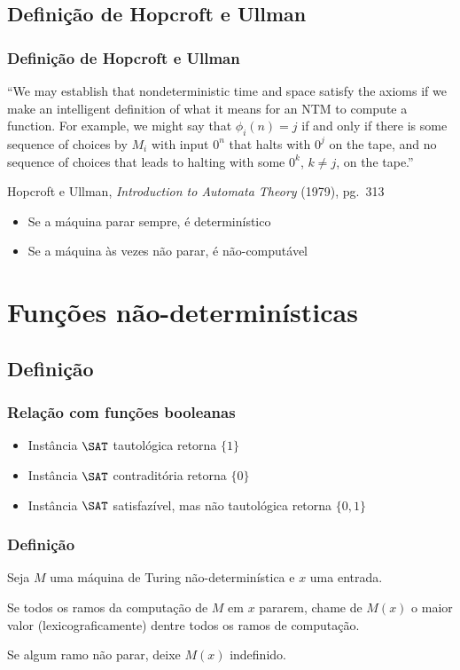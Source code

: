 \documentclass[utf8,notheorems]{beamer}
\theoremstyle{definition}
\begin{document}
\subsection{Definição de Hopcroft e Ullman}
\begin{frame}
    \frametitle{Definição de Hopcroft e Ullman}
    ``We may establish that nondeterministic time and space
    satisfy the axioms if we make an intelligent definition of what it means
    for an NTM to compute a function.
    For example, we might say that $\phi_i(n) = j$
    if and only if there is some sequence of choices by $M_i$ with input $0^n$
    that halts with $0^j$ on the tape,
    and no sequence of choices that leads to halting with some $0^k$, $k \neq j$,
    on the tape.''

    {\scriptsize
        Hopcroft e Ullman, \emph{Introduction to Automata Theory} (1979), pg.~313
    }

    \pause
    \begin{itemize}
        \item Se a máquina parar sempre, é determinístico
        \item Se a máquina às vezes não parar, é não-computável
    \end{itemize}
\end{frame}

\section{Funções não-determinísticas}

\subsection{Definição}
\begin{frame}
    \frametitle{Relação com funções booleanas}
    \begin{itemize}
        \item Instância $\SAT$ tautológica retorna $\{1\}$
        \item Instância $\SAT$ contraditória retorna $\{0\}$
        \item Instância $\SAT$ satisfazível, mas não tautológica retorna $\{0, 1\}$
    \end{itemize}
\end{frame}
\begin{frame}
    \frametitle{Definição}
    Seja $M$ uma máquina de Turing não-determinística
    e $x$ uma entrada.

    Se todos os ramos da computação de $M$ em $x$ pararem,
    chame de $M(x)$ o maior valor
    (lexicograficamente)
    dentre todos os ramos de computação.

    Se algum ramo não parar,
    deixe $M(x)$ indefinido.
\end{frame}
\end{document}
